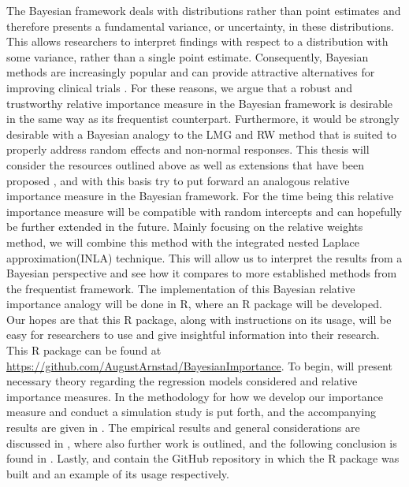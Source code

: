 The Bayesian framework deals with distributions rather than point estimates and therefore presents a fundamental variance, or uncertainty, in these distributions.
This allows researchers to interpret findings with respect to a distribution with some variance, rather than a single point estimate.
Consequently, Bayesian methods are increasingly popular \citep{hackenberger2019bayes} and can provide attractive alternatives for improving clinical trials \citep{lee2012bayesian}.
For these reasons, we argue that a robust and trustworthy relative importance measure in the Bayesian framework is desirable in the same way as its frequentist counterpart.
Furthermore, it would be strongly desirable with a Bayesian analogy to the LMG and RW method that is suited to properly address random effects and non-normal responses.
\newline
\newline
This thesis will consider the resources outlined above as well as extensions that have been proposed \citep{matre}, and with this basis try to put forward an analogous relative importance measure in the Bayesian framework.
For the time being this relative importance measure will be compatible with random intercepts and can hopefully be further extended in the future.
Mainly focusing on the relative weights method, we will combine this method with the integrated nested Laplace approximation(INLA) technique.
This will allow us to interpret the results from a Bayesian perspective and see how it compares to more established methods from the frequentist framework.
The implementation of this Bayesian relative importance analogy will be done in R, where an R package will be developed.
Our hopes are that this R package, along with instructions on its usage, will be easy for researchers to use and give insightful information into their research.
This R package can be found at \url{https://github.com/AugustArnstad/BayesianImportance}.
\newline 
\newline 
To begin,  will present necessary theory regarding the regression models considered and relative importance measures. 
In  the methodology for how we develop our importance measure and conduct a simulation study is put forth, and the accompanying results are given in .
The empirical results and general considerations are discussed in , where also further work is outlined, and the following conclusion is found in .
Lastly,  and  contain the GitHub repository in which the R package was built and an example of its usage respectively.



